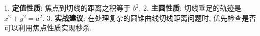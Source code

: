 \begin{summarybox}
1. \textbf{定值性质}: 焦点到切线的距离之积等于 $b^2$.
2. \textbf{主圆性质}: 切线垂足的轨迹是 $x^2 + y^2 = a^2$.
3. \textbf{实战建议}: 在处理复杂的圆锥曲线切线距离问题时, 优先检查是否可以利用焦点性质实现秒杀.
\end{summarybox}